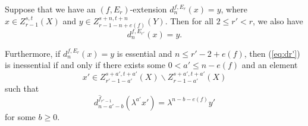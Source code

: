\documentclass{amsart}
\numberwithin{equation}{section}
\begin{document}
\begin{proposition}\label{prop:dec738d3}
    Suppose that we have an $(f,E_r)$-extension $d^{f,E_r}_n(x)=y$, where $x\in Z_{r-1}^{s,t}(X)$ and $y\in Z_{r-1-n+e(f)}^{s+n,t+n}(Y)$. Then for all $2\le r'<r$, we also have
    \begin{equation}\label{eq:dr'}
        d^{f,E_{r'}}_n(x)=y.
    \end{equation}

    Furthermore, if $d^{f,E_r}_n(x)=y$ is essential and $n\le r'-2+e(f)$, then (\ref{eq:dr'}) is inessential if and only if there exists some $0<a'\le n-e(f)$ and an element
    $$x'\in Z_{r'-1-a'}^{s+a',t+a'}(X)\backslash Z_{r-1-a'}^{s+a',t+a'}(X)$$
    such that
    $$d^{\hat f_{r'-1}}_{n-a'-b}(\lambda^{a'} x')=\lambda^{n-b-e(f)} y'$$
    for some $b\ge 0$.
    
\end{proposition}
\end{document}

